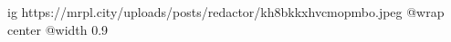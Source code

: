  
 
 
 
 

\ifcmt
  ig https://mrpl.city/uploads/posts/redactor/kh8bkkxhvcmopmbo.jpeg
  @wrap center
  @width 0.9
\fi
